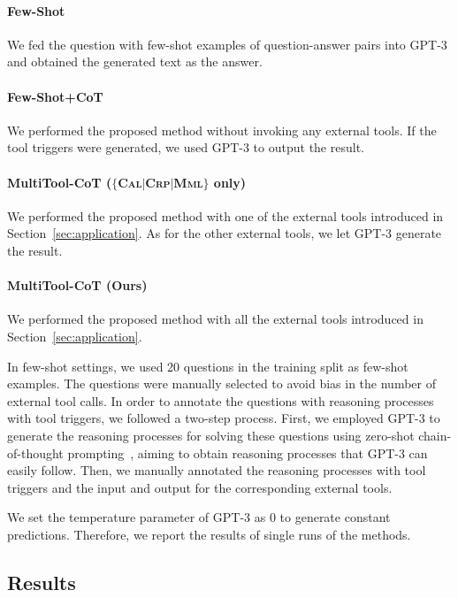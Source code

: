 \paragraph{Few-Shot}
We fed the question with few-shot examples of question-answer pairs into GPT-3 and obtained the generated text as the answer.

\paragraph{Few-Shot+CoT}
We performed the proposed method without invoking any external tools.
If the tool triggers were generated, we used GPT-3 to output the result.

\paragraph{MultiTool-CoT ($\{$\textsc{Cal}$|$\textsc{Crp}$|$\textsc{Mml}$\}$ only)}
We performed the proposed method with one of the external tools introduced in Section~\ref{sec:application}.
As for the other external tools, we let GPT-3 generate the result.

\paragraph{MultiTool-CoT (Ours)}
We performed the proposed method with all the external tools introduced in Section~\ref{sec:application}.

In few-shot settings, we used 20 questions in the training split as few-shot examples.
The questions were manually selected to avoid bias in the number of external tool calls.
In order to annotate the questions with reasoning processes with tool triggers, we followed a two-step process.
First, we employed GPT-3 to generate the reasoning processes for solving these questions using zero-shot chain-of-thought prompting~\cite{kojima2022large}, aiming to obtain reasoning processes that GPT-3 can easily follow.
Then, we manually annotated the reasoning processes with tool triggers and the input and output for the corresponding external tools.

We set the temperature parameter of GPT-3 as 0 to generate constant predictions.
Therefore, we report the results of single runs of the methods.

\subsection{Results}

